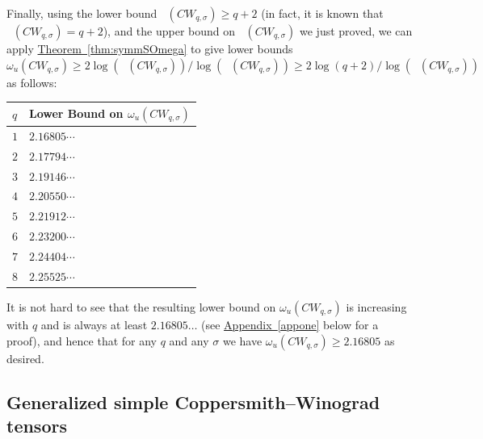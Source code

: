 \documentclass[11pt]{article}
\numberwithin{equation}{section}
\theoremstyle{definition}
\theoremstyle{plain}
\newcommand{\expref}[2]{\hyperref[#2]{#1~\ref{#2}}}
\newcommand{\trr}{\mathop{\tilde{\operatorname{R}}}}
\newcommand{\tsr}{\mathop{\tilde{\operatorname{S}}}}
\theoremstyle{definition}
\begin{document}
Finally, using the lower bound $\trr(CW_{q,\sigma}) \geq q+2$ (in fact, it is known that $\trr(CW_{q,\sigma}) = q+2$), and the upper bound on $\tsr(CW_{q,\sigma})$ we just proved, we can apply \expref{Theorem}{thm:symmSOmega} to give lower bounds $\omega_u(CW_{q,\sigma}) \geq 2 \log(\trr(CW_{q,\sigma})) / \log(\tsr(CW_{q,\sigma})) \geq 2 \log(q+2) / \log(\tsr(CW_{q,\sigma}))$ as follows:

\begin{center}
\begin{tabular}{l|l}
$q$ & Lower Bound on $\omega_u(CW_{q,\sigma})$ \\ \hline
$1$                                & $2.16805\cdots$                                                        \\
$2$                                & $2.17794\cdots$                                                        \\
$3$                                & $2.19146\cdots$                                                        \\
$4$                                & $2.20550\cdots$                                                        \\
$5$                                & $2.21912\cdots$                                                           \\
$6$                                & $2.23200\cdots$                                                       \\
$7$                                & $2.24404\cdots$                                                       \\
$8$                                & $2.25525\cdots$                                                        
\end{tabular}
\end{center}

It is not hard to see that the resulting lower bound on $\omega_u(CW_{q,\sigma})$ is increasing with $q$ and is always at least $2.16805\ldots$ (see \expref{Appendix}{appone} below for a proof), and hence that for any $q$ and any $\sigma$ we have $\omega_u(CW_{q,\sigma}) \geq 2.16805$ as desired.





%
\subsection{Generalized simple Coppersmith--Winograd tensors} \label{subsec:gensimplecw}
\end{document}
